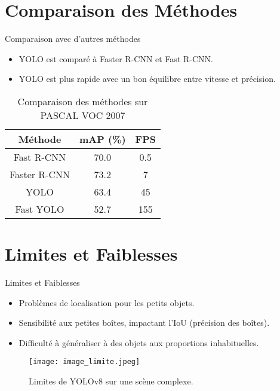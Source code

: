 \documentclass{beamer}
\begin{document}
\section{Comparaison des Méthodes}
\begin{frame}{Comparaison avec d'autres méthodes}
    \begin{itemize}
        \item YOLO est comparé à Faster R-CNN et Fast R-CNN.
        \item YOLO est plus rapide avec un bon équilibre entre vitesse et précision.
    \end{itemize}
    \begin{table}[]
    \centering
    \begin{tabular}{|c|c|c|}
    \hline
    Méthode       & mAP (\%) & FPS \\ \hline
    Fast R-CNN    & 70.0     & 0.5 \\ \hline
    Faster R-CNN  & 73.2     & 7   \\ \hline
    YOLO          & 63.4     & 45  \\ \hline
    Fast YOLO     & 52.7     & 155 \\ \hline
    \end{tabular}
    \caption{Comparaison des méthodes sur PASCAL VOC 2007}
    \end{table}
\end{frame}


\section{Limites et Faiblesses}
\begin{frame}{Limites et Faiblesses}
    \begin{itemize}
        \item Problèmes de localisation pour les petits objets.
        \item Sensibilité aux petites boîtes, impactant l'IoU (précision des boîtes).
        \item Difficulté à généraliser à des objets aux proportions inhabituelles.
    \end{itemize}

    \begin{figure}
        \centering
        \texttt{[image: image\_limite.jpeg]}
        \caption{Limites de YOLOv8 sur une scène complexe.}
    \end{figure}
\end{frame}
\end{document}

